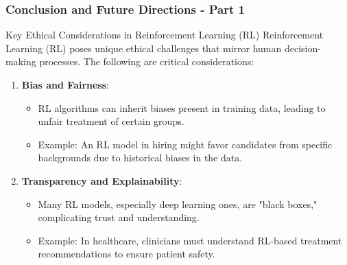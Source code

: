 \documentclass[aspectratio=169]{beamer}
\begin{document}
\begin{frame}[fragile]
    \frametitle{Conclusion and Future Directions - Part 1}
    \begin{block}{Key Ethical Considerations in Reinforcement Learning (RL)}
        Reinforcement Learning (RL) poses unique ethical challenges that mirror human decision-making processes. The following are critical considerations:
    \end{block}
    
    \begin{enumerate}
        \item \textbf{Bias and Fairness}:
        \begin{itemize}
            \item RL algorithms can inherit biases present in training data, leading to unfair treatment of certain groups.
            \item Example: An RL model in hiring might favor candidates from specific backgrounds due to historical biases in the data.
        \end{itemize}
        
        \item \textbf{Transparency and Explainability}:
        \begin{itemize}
            \item Many RL models, especially deep learning ones, are "black boxes," complicating trust and understanding.
            \item Example: In healthcare, clinicians must understand RL-based treatment recommendations to ensure patient safety.
        \end{itemize}
    \end{enumerate}
\end{frame}
\end{document}
